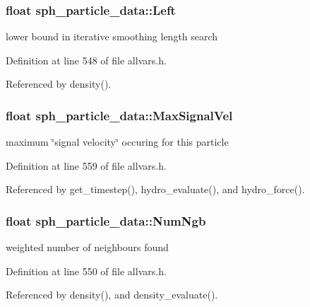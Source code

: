 \hypertarget{structsph__particle__data_a05d75ccc7dbd52562b7211fc74e674af}{
\subsubsection[{Left}]{\setlength{\rightskip}{0pt plus 5cm}float {\bf sph\_\-particle\_\-data::Left}}}
\label{structsph__particle__data_a05d75ccc7dbd52562b7211fc74e674af}
lower bound in iterative smoothing length search 

Definition at line 548 of file allvars.h.



Referenced by density().

\hypertarget{structsph__particle__data_a86da008875968dfca41b35f4ca7f3164}{
\subsubsection[{MaxSignalVel}]{\setlength{\rightskip}{0pt plus 5cm}float {\bf sph\_\-particle\_\-data::MaxSignalVel}}}
\label{structsph__particle__data_a86da008875968dfca41b35f4ca7f3164}
maximum \char`\"{}signal velocity\char`\"{} occuring for this particle 

Definition at line 559 of file allvars.h.



Referenced by get\_\-timestep(), hydro\_\-evaluate(), and hydro\_\-force().

\hypertarget{structsph__particle__data_a8038c8b4be4a553e5c13c9b9e711c5c0}{
\subsubsection[{NumNgb}]{\setlength{\rightskip}{0pt plus 5cm}float {\bf sph\_\-particle\_\-data::NumNgb}}}
\label{structsph__particle__data_a8038c8b4be4a553e5c13c9b9e711c5c0}
weighted number of neighbours found 

Definition at line 550 of file allvars.h.



Referenced by density(), and density\_\-evaluate().

